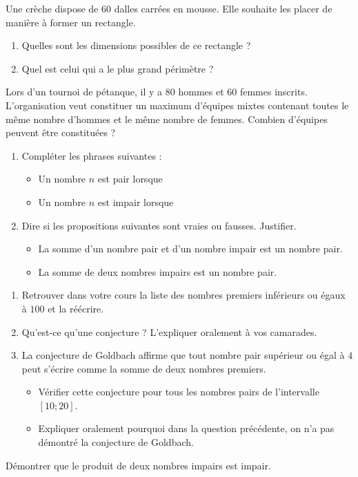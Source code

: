 \documentclass[a4paper]{article}
\begin{document}
\bigskip

\exo Une crèche dispose de $60$ dalles carrées en mousse. Elle souhaite les placer de manière à former un rectangle.
\begin{enumerate}
  \item Quelles sont les dimensions possibles de ce rectangle ?
  \item Quel est celui qui a le plus grand périmètre ?
\end{enumerate}

\bigskip

\exo Lors d'un tournoi de pétanque, il y a $80$ hommes et $60$ femmes inscrits. L'organisation veut constituer un maximum d'équipes mixtes contenant toutes le même nombre d'hommes et le même nombre de femmes. Combien d'équipes peuvent être constituées ?

\bigskip

\exo\vspace*{-2mm}
\begin{enumerate}
  \item Compléter les phrases suivantes :
    \begin{itemize}
      \item Un nombre $n$ est pair lorsque \dotfill
      \item Un nombre $n$ est impair lorsque \dotfill
    \end{itemize}
  \item Dire si les propositions suivantes sont vraies ou fausses. Justifier.
    \begin{itemize}
      \item \og{}La somme d'un nombre pair et d'un nombre impair est un nombre pair.\fg{}
      \item \og{}La somme de deux nombres impairs est un nombre pair.\fg{}
    \end{itemize}
\end{enumerate}

\bigskip

\exo\vspace*{-2mm}
\begin{enumerate}
  \item Retrouver dans votre cours la liste des nombres premiers inférieurs ou égaux à $100$ et la réécrire.
  \item Qu'est-ce qu'une conjecture ? L'expliquer oralement à vos camarades.
  \item La conjecture de Goldbach affirme que \og{}tout nombre pair supérieur ou égal à $4$ peut s'écrire comme la somme de deux nombres premiers.\fg{}
    \begin{itemize}
      \item Vérifier cette conjecture pour tous les nombres pairs de l'intervalle $[10;20]$.
      \item Expliquer oralement pourquoi dans la question précédente, on n'a pas démontré la conjecture de Goldbach.
    \end{itemize}
\end{enumerate}

\bigskip

\exo Démontrer que le produit de deux nombres impairs est impair.

\bigskip
\end{document}
